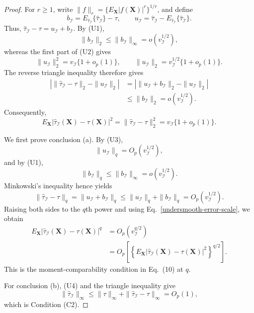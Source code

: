 \documentclass[11pt]{article}
\theoremstyle{referenceplain}
\theoremstyle{referencedefinition}
\theoremstyle{referenceremark}
\begin{document}
\begin{proof}
For $r\ge1$, write
$\|f\|_r=\{E_{\mathbf X}|f(\mathbf X)|^r\}^{1/r}$, and define
\[
b_{\mathcal I}
=E_{\widehat\tau_{\mathcal I}}\{\widehat\tau_{\mathcal I}\}-\tau,
\qquad
u_{\mathcal I}
=\widehat\tau_{\mathcal I}
-E_{\widehat\tau_{\mathcal I}}\{\widehat\tau_{\mathcal I}\}.
\]
Thus,
$\widehat\tau_{\mathcal I}-\tau=u_{\mathcal I}+b_{\mathcal I}$.
By (U1),
\[
\|b_{\mathcal I}\|_2
\le \|b_{\mathcal I}\|_\infty
=o(v_{\mathcal I}^{1/2}),
\]
whereas the first part of (U2) gives
\[
\|u_{\mathcal I}\|_2^2
=v_{\mathcal I}\{1+o_p(1)\},
\qquad
\|u_{\mathcal I}\|_2
=v_{\mathcal I}^{1/2}\{1+o_p(1)\}.
\]
The reverse triangle inequality therefore gives
\begin{align*}
\left|
\|\widehat\tau_{\mathcal I}-\tau\|_2
-\|u_{\mathcal I}\|_2
\right|
&=
\left|
\|u_{\mathcal I}+b_{\mathcal I}\|_2
-\|u_{\mathcal I}\|_2
\right|\\
&\le \|b_{\mathcal I}\|_2
=o(v_{\mathcal I}^{1/2}).
\end{align*}
Consequently,
\begin{equation}\label{undersmooth-error-scale}
E_{\mathbf X}
|\widehat\tau_{\mathcal I}(\mathbf X)-\tau(\mathbf X)|^2
=\|\widehat\tau_{\mathcal I}-\tau\|_2^2
=v_{\mathcal I}\{1+o_p(1)\}.
\end{equation}

We first prove conclusion (a). By (U3),
\[
\|u_{\mathcal I}\|_q
=O_p(v_{\mathcal I}^{1/2}),
\]
and by (U1),
\[
\|b_{\mathcal I}\|_q
\le \|b_{\mathcal I}\|_\infty
=o(v_{\mathcal I}^{1/2}).
\]
Minkowski's inequality hence yields
\[
\|\widehat\tau_{\mathcal I}-\tau\|_q
=\|u_{\mathcal I}+b_{\mathcal I}\|_q
\le \|u_{\mathcal I}\|_q+\|b_{\mathcal I}\|_q
=O_p(v_{\mathcal I}^{1/2}).
\]
Raising both sides to the $q$th power and using
Eq.~\eqref{undersmooth-error-scale}, we obtain
\begin{align*}
E_{\mathbf X}
|\widehat\tau_{\mathcal I}(\mathbf X)-\tau(\mathbf X)|^q
&=O_p(v_{\mathcal I}^{q/2})\\
&=O_p\left[
\left\{
E_{\mathbf X}
|\widehat\tau_{\mathcal I}(\mathbf X)-\tau(\mathbf X)|^2
\right\}^{q/2}
\right].
\end{align*}
This is the moment-comparability condition in Eq.~(10) at $q$.

For conclusion (b), (U4) and the triangle inequality give
\[
\|\widehat\tau_{\mathcal I}\|_\infty
\le
\|\tau\|_\infty
+\|\widehat\tau_{\mathcal I}-\tau\|_\infty
=O_p(1),
\]
which is Condition (C2).


\end{proof}
\end{document}
